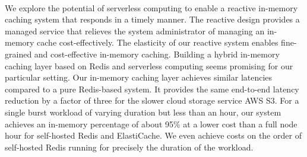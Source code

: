 ~\\
We explore the potential of serverless computing to enable a reactive in-memory caching system that responds in a timely manner. The reactive design provides a managed service that relieves the system administrator of managing an in-memory cache cost-effectively. The elasticity of our reactive system enables fine-grained and cost-effective in-memory caching. Building a hybrid in-memory caching layer based on Redis and serverless computing seems promising for our particular setting. Our in-memory caching layer achieves similar latencies compared to a pure Redis-based system. It provides the same end-to-end latency reduction by a factor of three for the slower cloud storage service AWS S3. For a single burst workload of varying duration but less than an hour, our system achieves an in-memory percentage of about 95\% at a lower cost than a full node hour for self-hosted Redis and ElastiCache. We even achieve costs on the order of self-hosted Redis running for precisely the duration of the workload.




